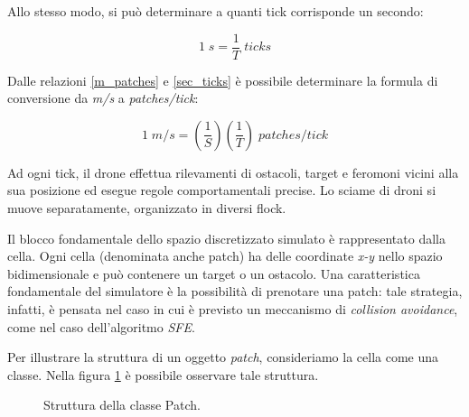 Allo stesso modo, si può determinare a quanti tick corrisponde un secondo:

\begin{equation}
    \label{sec_ticks}
    1 \; s = \frac{1}{T} \; ticks
\end{equation}

Dalle relazioni \ref{m_patches} e \ref{sec_ticks} è possibile determinare la formula di conversione da \textit{m/s} a \textit{patches/tick}:

\begin{equation*}
    1 \; m/s = (\frac{1}{S})(\frac{1}{T}) \; patches/tick 
\end{equation*}

Ad ogni tick, il drone effettua rilevamenti di ostacoli, target e feromoni vicini alla sua posizione ed esegue regole comportamentali precise.
Lo sciame di droni si muove separatamente, organizzato in diversi flock.

Il blocco fondamentale dello spazio discretizzato simulato è rappresentato dalla cella.
Ogni cella (denominata anche patch) ha delle coordinate \textit{x-y} nello spazio bidimensionale e può contenere un target o un ostacolo.
Una caratteristica fondamentale del simulatore è la possibilità di prenotare una patch: tale strategia, infatti, è pensata nel caso in cui è previsto un meccanismo di \textit{collision avoidance}, come nel caso dell'algoritmo \textit{SFE}.

Per illustrare la struttura di un oggetto \textit{patch}, consideriamo la cella come una classe.
Nella figura \ref{classe_patch} è possibile osservare tale struttura.

\begin{figure}[H] 
    \captionsetup{justification=centering, margin=2cm, font=footnotesize}
    \begin{center}
    \end{center}
    \caption{Struttura della classe Patch.}
    \label{classe_patch}
\end{figure}

